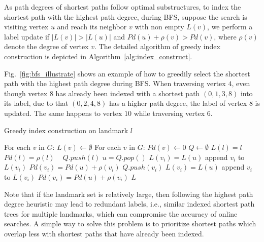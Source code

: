 As path degrees of shortest paths follow optimal substructures, 
to index the shortest path with the highest path degree, during BFS, suppose the search is visiting vertex $u$ and reach its neighbor $v$ with non empty $L(v)$, we perform a label update if $|L(v)| > |L(u)|$ and $Pd(u) + \rho(v) > Pd(v)$, where $\rho(v)$ denote the degree of vertex $v$. The detailed algorithm of greedy index construction is depicted in Algorithm~\ref{alg:index_construct}. 

Fig.~\ref{fig:bfs_illustrate} shows an example of how to greedily select the shortest path with the highest path degree during BFS. When traversing vertex $4$, even though vertex $8$ has already been indexed with a shortest path $(0, 1, 3, 8)$ into its label, due to that $(0, 2, 4, 8)$ has a higher path degree, the label of vertex $8$ is updated. The same happens to vertex $10$ while traversing vertex $6$. 

\begin{algorithm}[h]
    \caption{Greedy index construction on landmark $l$}
		\label{alg:index_construct}
    \begin{algorithmic}
						\State For each $v$ in $G$: $L(v) \gets \emptyset$
						\State For each $v$ in $G$: $Pd(v) \gets 0$
						\State $Q \gets \emptyset$
						\State $L(l) = l$
						\State $Pd(l) = \rho(l)$ \
						\State $Q.push(l)$
								\State $u = Q.pop()$
												\State $L(v_i) = L(u)$
												\State append $v_i$ to $L(v_i)$
												\State $Pd(v_i) = Pd(u) + \rho(v_i)$
												\State $Q.push(v_i)$
												\State $L(v_i) = L(u)$
												\State append $v_i$ to $L(v_i)$
												\State $Pd(v_i) = Pd(u) + \rho(v_i)$
										\EndIf
								\EndFor
						\EndWhile
						\State \Return $L$
        \EndFunction
    \end{algorithmic}
\end{algorithm}

Note that if the landmark set is relatively large, then following the highest path degree heuristic may lead to redundant labels, i.e., similar indexed shortest path trees for multiple landmarks, which can compromise the accuracy of online searches. A simple way to solve this problem is to prioritize shortest paths which overlap less with shortest paths that have already been indexed.